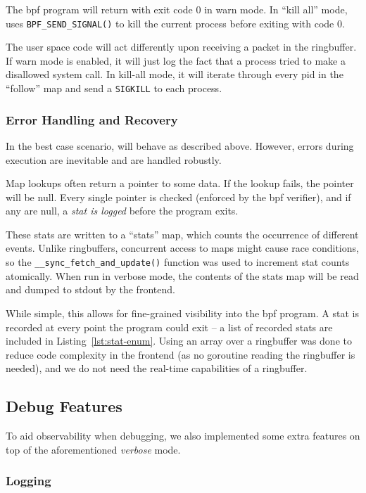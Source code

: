 The \ac{bpf} program will return with exit code 0 in warn mode. In ``kill
all'' mode, \af uses \texttt{BPF\_SEND\_SIGNAL()} to kill the current process
before exiting with code 0.

The user space code will act differently upon receiving a packet in the
ringbuffer. If warn mode is enabled, it will just log the fact that a process
tried to make a disallowed system call. In kill-all mode, it will iterate through
every \ac{pid} in the ``follow'' map and send a \texttt{SIGKILL} to each
process.

\subsubsection{Error Handling and Recovery}\label{subsubsec:err-handling}

In the best case scenario, \af will behave as described above. However, errors
during execution are inevitable and are handled robustly. 

Map lookups often return a pointer to some data. If the lookup fails, the
pointer will be null. Every single pointer is checked (enforced by the \ac{bpf}
verifier), and if any are null, a \textit{stat is logged} before the program
exits.

These stats are written to a ``stats'' map, which counts the occurrence of
different events. Unlike ringbuffers, concurrent access to maps might cause race
conditions, so the \texttt{\_\_sync\_fetch\_and\_update()} function was used to
increment stat counts atomically. When run in verbose mode, the contents of the
stats map will be read and dumped to \ac{stdout} by the frontend.

While simple, this allows for fine-grained visibility into the \ac{bpf} program.
A stat is recorded at every point the program could exit -- a list of recorded
stats are included in Listing~\ref{lst:stat-enum}. Using an array over a
ringbuffer was done to reduce code complexity in the frontend (as no goroutine
reading the ringbuffer is needed), and we do not need the real-time capabilities
of a ringbuffer.

\subsection{Debug Features}

To aid observability when debugging, we also implemented some extra features
on top of the aforementioned \textit{verbose} mode.

\subsubsection{Logging}

